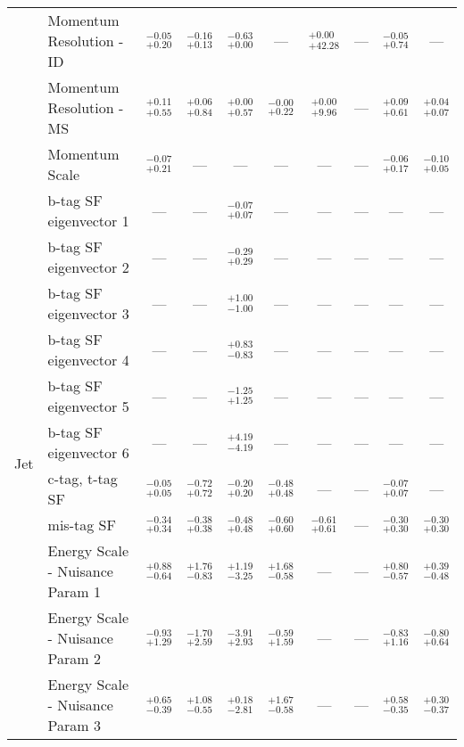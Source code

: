 \begin{tabular}{|cl||cccccc|c||c|}
&Momentum Resolution - ID &  $^{-0.05}_{+0.20}$  &  $^{-0.16}_{+0.13}$  &  $^{-0.63}_{+0.00}$  & --- &  $^{+0.00}_{+42.28}$  & --- &  $^{-0.05}_{+0.74}$  & ---\\ 
\cline{2-10}
&Momentum Resolution - MS &  $^{+0.11}_{+0.55}$  &  $^{+0.06}_{+0.84}$  &  $^{+0.00}_{+0.57}$  &  $^{-0.00}_{+0.22}$  &  $^{+0.00}_{+9.96}$  & --- &  $^{+0.09}_{+0.61}$  &  $^{+0.04}_{+0.07}$ \\ 
\cline{2-10}
&Momentum Scale &  $^{-0.07}_{+0.21}$  & --- & --- & --- & --- & --- &  $^{-0.06}_{+0.17}$  &  $^{-0.10}_{+0.05}$ \\ 
\hline
\multirow{27}{*}{Jet}
&b-tag SF eigenvector 1 & --- & --- &  $^{-0.07}_{+0.07}$  & --- & --- & --- & --- & ---\\ 
\cline{2-10}
&b-tag SF eigenvector 2 & --- & --- &  $^{-0.29}_{+0.29}$  & --- & --- & --- & --- & ---\\ 
\cline{2-10}
&b-tag SF eigenvector 3 & --- & --- &  $^{+1.00}_{-1.00}$  & --- & --- & --- & --- & ---\\ 
\cline{2-10}
&b-tag SF eigenvector 4 & --- & --- &  $^{+0.83}_{-0.83}$  & --- & --- & --- & --- & ---\\ 
\cline{2-10}
&b-tag SF eigenvector 5 & --- & --- &  $^{-1.25}_{+1.25}$  & --- & --- & --- & --- & ---\\ 
\cline{2-10}
&b-tag SF eigenvector 6 & --- & --- &  $^{+4.19}_{-4.19}$  & --- & --- & --- & --- & ---\\ 
\cline{2-10}
&c-tag, t-tag SF &  $^{-0.05}_{+0.05}$  &  $^{-0.72}_{+0.72}$  &  $^{-0.20}_{+0.20}$  &  $^{-0.48}_{+0.48}$  & --- & --- &  $^{-0.07}_{+0.07}$  & ---\\ 
\cline{2-10}
&mis-tag SF &  $^{-0.34}_{+0.34}$  &  $^{-0.38}_{+0.38}$  &  $^{-0.48}_{+0.48}$  &  $^{-0.60}_{+0.60}$  &  $^{-0.61}_{+0.61}$  & --- &  $^{-0.30}_{+0.30}$  &  $^{-0.30}_{+0.30}$ \\ 
\cline{2-10}
&Energy Scale - Nuisance Param 1 &  $^{+0.88}_{-0.64}$  &  $^{+1.76}_{-0.83}$  &  $^{+1.19}_{-3.25}$  &  $^{+1.68}_{-0.58}$  & --- & --- &  $^{+0.80}_{-0.57}$  &  $^{+0.39}_{-0.48}$ \\ 
\cline{2-10}
&Energy Scale - Nuisance Param 2 &  $^{-0.93}_{+1.29}$  &  $^{-1.70}_{+2.59}$  &  $^{-3.91}_{+2.93}$  &  $^{-0.59}_{+1.59}$  & --- & --- &  $^{-0.83}_{+1.16}$  &  $^{-0.80}_{+0.64}$ \\ 
\cline{2-10}
&Energy Scale - Nuisance Param 3 &  $^{+0.65}_{-0.39}$  &  $^{+1.08}_{-0.55}$  &  $^{+0.18}_{-2.81}$  &  $^{+1.67}_{-0.58}$  & --- & --- &  $^{+0.58}_{-0.35}$  &  $^{+0.30}_{-0.37}$ \\ 

\end{tabular}

